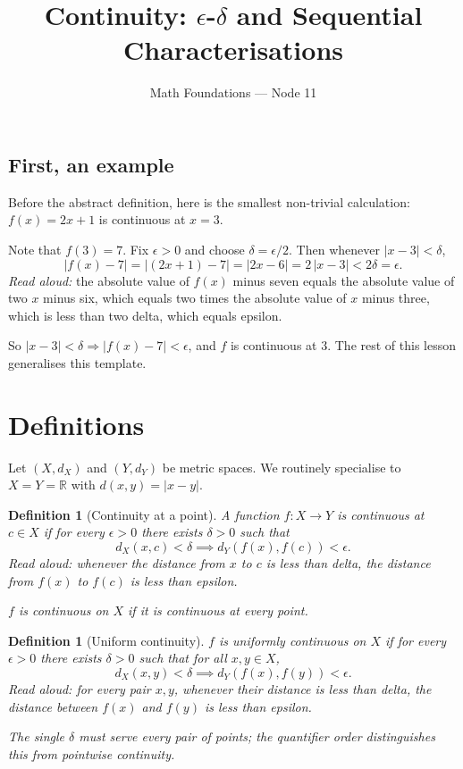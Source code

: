 \documentclass[11pt]{article}
\title{Continuity: $\epsilon$-$\delta$ and Sequential Characterisations}
\author{Math Foundations --- Node 11}
\date{}
\newtheorem{definition}[theorem]{Definition}
\begin{document}
\maketitle

\subsection*{First, an example}

Before the abstract definition, here is the smallest non-trivial calculation:
$f(x) = 2x + 1$ is continuous at $x = 3$.

\noindent Note that $f(3) = 7$. Fix $\epsilon > 0$ and choose $\delta = \epsilon / 2$.
Then whenever $|x - 3| < \delta$,
\[
  |f(x) - 7| = |(2x + 1) - 7| = |2x - 6| = 2\,|x - 3| < 2\delta = \epsilon.
\]
\emph{Read aloud:} the absolute value of $f(x)$ minus seven equals the absolute value of two $x$ minus six, which equals two times the absolute value of $x$ minus three, which is less than two delta, which equals epsilon.

So $|x - 3| < \delta \Rightarrow |f(x) - 7| < \epsilon$, and $f$ is continuous at $3$. The rest of this lesson generalises this template.

\section{Definitions}

Let $(X, d_X)$ and $(Y, d_Y)$ be metric spaces. We routinely specialise
to $X = Y = \mathbb{R}$ with $d(x, y) = |x - y|$.

\begin{definition}[Continuity at a point]\label{def:cont}
A function $f : X \to Y$ is \emph{continuous at $c \in X$} if for every
$\epsilon > 0$ there exists $\delta > 0$ such that
\[
  d_X(x, c) < \delta \implies d_Y(f(x), f(c)) < \epsilon.
\]
\emph{Read aloud:} whenever the distance from $x$ to $c$ is less than delta, the distance from $f(x)$ to $f(c)$ is less than epsilon.

$f$ is \emph{continuous on $X$} if it is continuous at every point.
\end{definition}

\begin{definition}[Uniform continuity]\label{def:unif}
$f$ is \emph{uniformly continuous on $X$} if for every $\epsilon > 0$ there
exists $\delta > 0$ such that for all $x, y \in X$,
\[
  d_X(x, y) < \delta \implies d_Y(f(x), f(y)) < \epsilon.
\]
\emph{Read aloud:} for every pair $x, y$, whenever their distance is less than delta, the distance between $f(x)$ and $f(y)$ is less than epsilon.

The single $\delta$ must serve every pair of points; the quantifier order
distinguishes this from pointwise continuity.
\end{definition}
\end{document}
